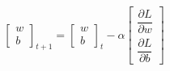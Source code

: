 \documentclass[preview]{standalone}
\begin{document}
\begin{align*}
\begin{bmatrix} w \\ b \end{bmatrix}_{t+1} = \begin{bmatrix} w \\ b \end{bmatrix}_{t} - \alpha \begin{bmatrix} \dfrac{\partial L}{\partial w} \\[1.2ex] \dfrac{\partial L}{\partial b} \end{bmatrix}
\end{align*}
\end{document}
